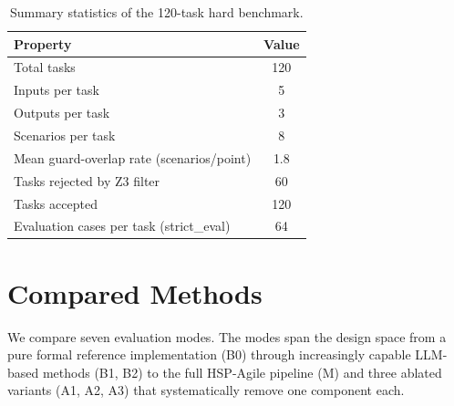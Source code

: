 \begin{table}[t]
  \caption{Summary statistics of the 120-task hard benchmark.}
  \label{tab:benchmark-stats}
  \centering
  \begin{tabular}{lc}
    \toprule
    Property & Value \\
    \midrule
    Total tasks & 120 \\
    Inputs per task & 5 \\
    Outputs per task & 3 \\
    Scenarios per task & 8 \\
    Mean guard-overlap rate (scenarios/point) & 1.8 \\
    Tasks rejected by Z3 filter & 60 \\
    Tasks accepted & 120 \\
    Evaluation cases per task (strict\_eval) & 64 \\
    \bottomrule
  \end{tabular}
\end{table}

\section{Compared Methods}
\label{sec:exp:methods}

We compare seven evaluation modes.  The modes span the design space from a pure
formal reference implementation (B0) through increasingly capable LLM-based methods
(B1, B2) to the full HSP-Agile pipeline (M) and three ablated variants (A1, A2, A3)
that systematically remove one component each.

